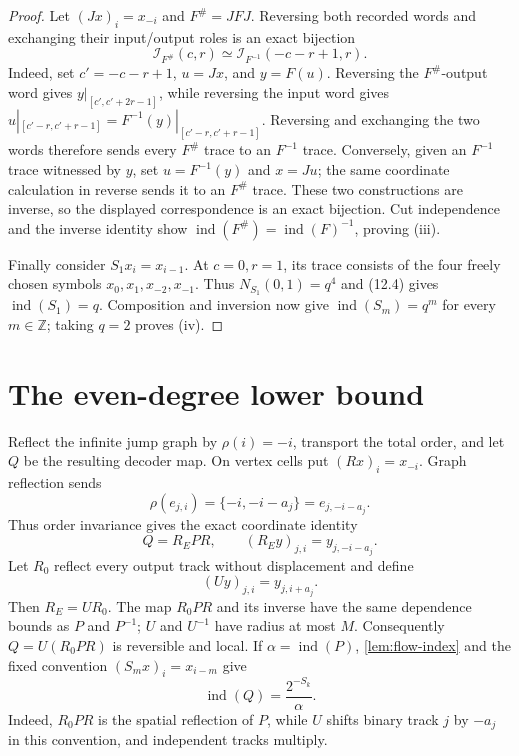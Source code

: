 \documentclass[11pt]{article}
\theoremstyle{definition}
\theoremstyle{remark}
\begin{document}
\begin{proof}
Let $(Jx)_i=x_{-i}$ and $F^\#=JFJ$.  Reversing both recorded words and
exchanging their input/output roles is an exact bijection
\[
 \mathcal I_{F^\#}(c,r)\simeq
 \mathcal I_{F^{-1}}(-c-r+1,r).
\]
Indeed, set $c'=-c-r+1$, $u=Jx$, and $y=F(u)$.  Reversing the
$F^\#$-output word gives $y|_{[c',c'+2r-1]}$, while reversing the input word
gives
$u|_{[c'-r,c'+r-1]}=F^{-1}(y)|_{[c'-r,c'+r-1]}$.  Reversing and exchanging
the two words therefore sends every $F^\#$ trace to an $F^{-1}$ trace.
Conversely, given an $F^{-1}$ trace witnessed by $y$, set
$u=F^{-1}(y)$ and $x=Ju$; the same coordinate calculation in reverse sends
it to an $F^\#$ trace.  These two constructions are inverse, so the displayed
correspondence is an exact bijection.
Cut independence and the inverse identity show
$\operatorname{ind}(F^\#)=\operatorname{ind}(F)^{-1}$, proving (iii).

Finally consider $S_1x_i=x_{i-1}$.  At $c=0,r=1$, its trace consists of the
four freely chosen symbols $x_0,x_1,x_{-2},x_{-1}$.  Thus
$N_{S_1}(0,1)=q^4$ and (12.4) gives
$\operatorname{ind}(S_1)=q$.  Composition and inversion now give
$\operatorname{ind}(S_m)=q^m$ for every $m\in\mathbb Z$; taking $q=2$
proves (iv).
\end{proof}

\section{The even-degree lower bound}
\label{sec:even-lower}

Reflect the infinite jump graph by $\rho(i)=-i$, transport the total order,
and let $Q$ be the resulting decoder map.  On vertex cells put
$(Rx)_i=x_{-i}$.  Graph reflection sends
\[
 \rho(e_{j,i})=\{-i,-i-a_j\}=e_{j,-i-a_j}.                 \tag{13.1}
\]
Thus order invariance gives the exact coordinate identity
\[
 Q=R_E P R,
 \qquad (R_E y)_{j,i}=y_{j,-i-a_j}.                        \tag{13.2}
\]
Let $R_0$ reflect every output track without displacement and define
\[
                         (Uy)_{j,i}=y_{j,i+a_j}.              \tag{13.3}
\]
Then $R_E=UR_0$.  The map $R_0PR$ and its inverse have the same dependence
bounds as $P$ and $P^{-1}$; $U$ and $U^{-1}$ have radius at most $M$.
Consequently $Q=U(R_0PR)$ is reversible and local.
If $\alpha=\operatorname{ind}(P)$,
\cref{lem:flow-index} and the fixed convention $(S_mx)_i=x_{i-m}$ give
\[
 \operatorname{ind}(Q)=\frac{2^{-S_k}}{\alpha}.             \tag{13.4}
\]
Indeed, $R_0PR$ is the spatial reflection of $P$, while $U$ shifts binary
track $j$ by $-a_j$ in this convention, and independent tracks multiply.
\end{document}
